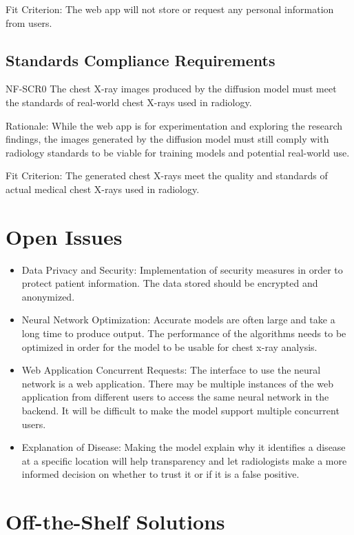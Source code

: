 \documentclass[12pt]{article}
\begin{document}
Fit Criterion: The web app will not store or request any personal information from users.

\subsection{Standards Compliance Requirements}
NF-SCR0 The chest X-ray images produced by the diffusion model must meet the standards of 
real-world chest X-rays used in radiology.

Rationale: While the web app is for experimentation and exploring the research findings, the 
images generated by the diffusion model must still comply with radiology standards to be viable 
for training models and potential real-world use.

Fit Criterion: The generated chest X-rays meet the quality and standards of actual medical chest 
X-rays used in radiology.

\section{Open Issues}
\begin{itemize}
    \item Data Privacy and Security: Implementation of security measures in order to protect 
    patient information. The data stored should be encrypted and anonymized.
    \item Neural Network Optimization: Accurate models are often large and take a long time to 
    produce output. The performance of the algorithms needs to be optimized in order for the model 
    to be usable for chest x-ray analysis.
    \item Web Application Concurrent Requests: The interface to use the neural network is a web 
    application. There may be multiple instances of the web application from different users to 
    access the same neural network in the backend. It will be difficult to make the model support 
    multiple concurrent users.
    \item Explanation of Disease: Making the model explain why it identifies a disease at a 
    specific location will help transparency and let radiologists make a more informed decision on 
    whether to trust it or if it is a false positive.
\end{itemize}

\section{Off-the-Shelf Solutions}
\end{document}
